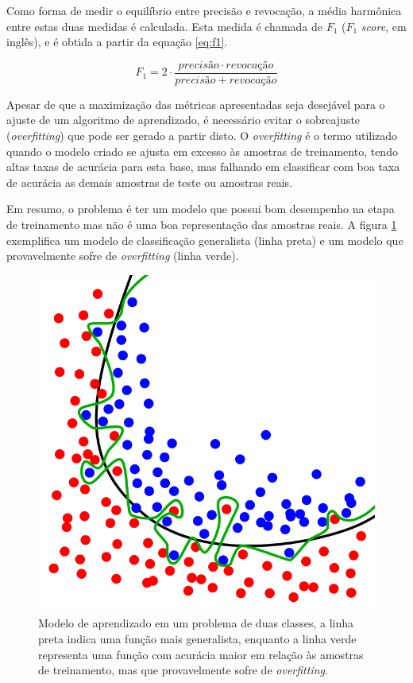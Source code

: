 Como forma de medir o equilíbrio entre precisão e revocação, a média harmônica entre estas duas medidas é calculada. Esta medida é chamada de $F_1$ ($F_1$ \textit{score}, em inglês), e é obtida a partir da equação \ref{eq:f1}.

\begin{equation}
  \displaystyle F_1 = 2 \cdot \frac{precisão \cdot revocação}{precisão + revocação}
\label{eq:f1}
\end{equation}

Apesar de que a maximização das métricas apresentadas seja desejável para o ajuste de um algoritmo de aprendizado, é necessário evitar o sobreajuste (\textit{overfitting}) que pode ser gerado a partir disto. O \textit{overfitting} é o termo utilizado quando o modelo criado se ajusta em excesso às amostras de treinamento, tendo altas taxas de acurácia para esta base, mas falhando em classificar com boa taxa de acurácia as demais amostras de teste ou amostras reais.

Em resumo, o problema é ter um modelo que possui bom desempenho na etapa de treinamento mas não é uma boa representação das amostras reais. A figura \ref{fig:overfitting} exemplifica um modelo de classificação generalista (linha preta) e um modelo que provavelmente sofre de \textit{overfitting} (linha verde).

\begin{figure}[h!]
  \centering
  \includegraphics[scale=0.4]{imgs/overfitting}
  \caption{Modelo de aprendizado em um problema de duas classes, a linha preta indica uma função mais generalista, enquanto a linha verde representa uma função com acurácia maior em relação às amostras de treinamento, mas que provavelmente sofre de \textit{overfitting.}}
  \label{fig:overfitting}
\end{figure}

